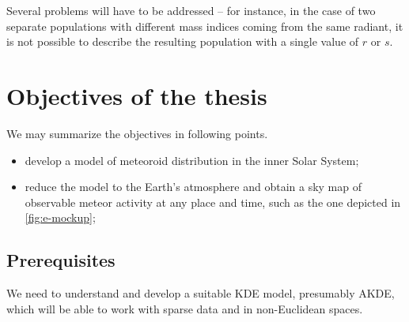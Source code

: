             Several problems will have to be addressed -- for instance, in the case of
            two separate populations with different mass indices coming from the same radiant,
            it is not possible to describe the resulting population with a single value of $r$ or $s$.

\section{Objectives of the thesis} \label{iO}
    We may summarize the objectives in following points.

    \begin{itemize}
        \item develop a model of meteoroid distribution in the inner Solar System;
        \item reduce the model to the Earth's atmosphere and obtain a sky map
            of observable meteor activity at any place and time,
            such as the one depicted in \cref{fig:e-mockup};
    \end{itemize}

    \subsection{Prerequisites} \label{iOp}
        We need to understand and develop a suitable KDE model, presumably AKDE,
        which will be able to work with sparse data and in non-Euclidean spaces.

